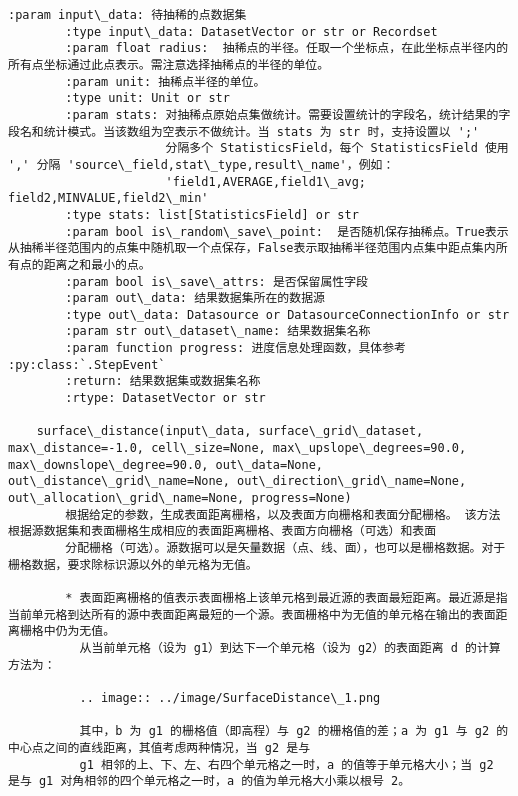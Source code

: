 \documentclass[11pt]{article}
\begin{document}
\begin{Verbatim}[commandchars=\\\{\}]
        :param input\_data: 待抽稀的点数据集
        :type input\_data: DatasetVector or str or Recordset
        :param float radius:  抽稀点的半径。任取一个坐标点，在此坐标点半径内的所有点坐标通过此点表示。需注意选择抽稀点的半径的单位。
        :param unit: 抽稀点半径的单位。
        :type unit: Unit or str
        :param stats: 对抽稀点原始点集做统计。需要设置统计的字段名，统计结果的字段名和统计模式。当该数组为空表示不做统计。当 stats 为 str 时，支持设置以 ';'
                      分隔多个 StatisticsField，每个 StatisticsField 使用 ',' 分隔 'source\_field,stat\_type,result\_name'，例如：
                      'field1,AVERAGE,field1\_avg; field2,MINVALUE,field2\_min'
        :type stats: list[StatisticsField] or str
        :param bool is\_random\_save\_point:  是否随机保存抽稀点。True表示从抽稀半径范围内的点集中随机取一个点保存，False表示取抽稀半径范围内点集中距点集内所有点的距离之和最小的点。
        :param bool is\_save\_attrs: 是否保留属性字段
        :param out\_data: 结果数据集所在的数据源
        :type out\_data: Datasource or DatasourceConnectionInfo or str
        :param str out\_dataset\_name: 结果数据集名称
        :param function progress: 进度信息处理函数，具体参考 :py:class:`.StepEvent`
        :return: 结果数据集或数据集名称
        :rtype: DatasetVector or str
    
    surface\_distance(input\_data, surface\_grid\_dataset, max\_distance=-1.0, cell\_size=None, max\_upslope\_degrees=90.0, max\_downslope\_degree=90.0, out\_data=None, out\_distance\_grid\_name=None, out\_direction\_grid\_name=None, out\_allocation\_grid\_name=None, progress=None)
        根据给定的参数，生成表面距离栅格，以及表面方向栅格和表面分配栅格。 该方法根据源数据集和表面栅格生成相应的表面距离栅格、表面方向栅格（可选）和表面
        分配栅格（可选）。源数据可以是矢量数据（点、线、面），也可以是栅格数据。对于栅格数据，要求除标识源以外的单元格为无值。
        
        * 表面距离栅格的值表示表面栅格上该单元格到最近源的表面最短距离。最近源是指当前单元格到达所有的源中表面距离最短的一个源。表面栅格中为无值的单元格在输出的表面距离栅格中仍为无值。
          从当前单元格（设为 g1）到达下一个单元格（设为 g2）的表面距离 d 的计算方法为：
        
          .. image:: ../image/SurfaceDistance\_1.png
        
          其中，b 为 g1 的栅格值（即高程）与 g2 的栅格值的差；a 为 g1 与 g2 的中心点之间的直线距离，其值考虑两种情况，当 g2 是与
          g1 相邻的上、下、左、右四个单元格之一时，a 的值等于单元格大小；当 g2 是与 g1 对角相邻的四个单元格之一时，a 的值为单元格大小乘以根号 2。
        

\end{Verbatim}
\end{document}
